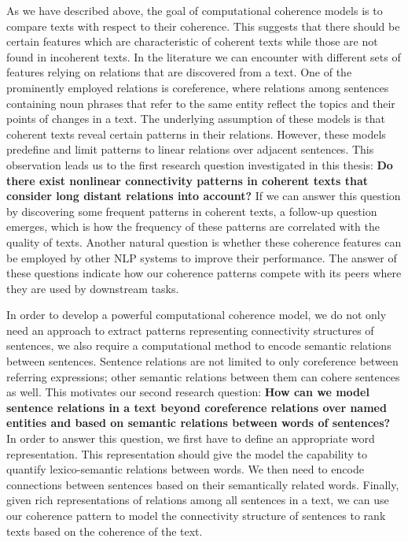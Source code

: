 As we have described above, the goal of computational coherence models is to compare texts with respect to their coherence. 
This suggests that there should be certain features which are characteristic of coherent texts while those are not found in incoherent texts. 
In the literature we can encounter with different sets of features relying on relations that are discovered from a text. 
One of the prominently employed relations is coreference, where relations among sentences containing noun phrases that refer to the same entity reflect the topics and their points of changes in a text.  
The underlying assumption of these models is that coherent texts reveal certain patterns in their relations. 
However, these models predefine and limit patterns to linear relations over adjacent sentences. 
This observation leads us to the first research question investigated in this thesis: 
\textbf{Do there exist nonlinear connectivity patterns in coherent texts that consider long distant relations into account?} 
If we can answer this question by discovering some frequent patterns in coherent texts, a follow-up question emerges, which is how the frequency of these patterns are correlated with the quality of texts. 
Another natural question is whether these coherence features can be employed by other NLP systems to improve their performance. 
The answer of these questions indicate how our coherence patterns compete with its peers where they are used by downstream tasks. 

In order to develop a powerful computational coherence model, we do not only need an approach to extract patterns representing connectivity structures of sentences, we also require a computational method to encode semantic relations between sentences. 
Sentence relations are not limited to only coreference between referring expressions; other semantic relations between them can cohere sentences as well. 
This motivates our second research question: \textbf{How can we model sentence relations in a text beyond coreference relations over named entities and based on semantic relations between words of sentences?}  
In order to answer this question, we first have to define an appropriate word representation.  
This representation should give the model the capability to quantify lexico-semantic relations between words. 
We then need to encode connections between sentences based on their semantically related words.
Finally, given rich representations of relations among all sentences in a text, we can use our coherence pattern to model the connectivity structure of sentences to rank texts based on the coherence of the text. 

